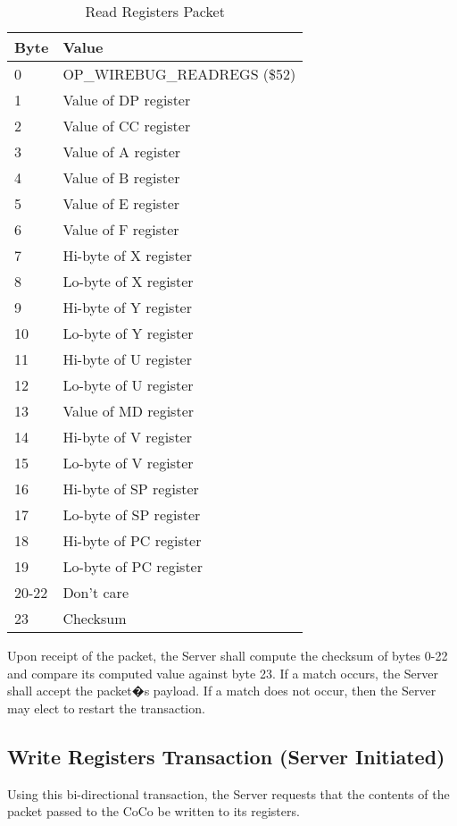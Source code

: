 \documentclass{article}
\begin{document}
\begin{table}[ht]
\caption{Read Registers Packet}
\begin{center}
\begin{tabular}{|ll|}
\hline
Byte & Value \\ \hline
0 & OP\_WIREBUG\_READREGS (\$52) \\
1 & Value of DP register \\
2 & Value of CC register \\
3 & Value of A register \\
4 & Value of B register \\
5 & Value of E register \\
6 & Value of F register \\
7 & Hi-byte of X register \\
8 & Lo-byte of X register \\
9 & Hi-byte of Y register \\
10 & Lo-byte of Y register \\
11 & Hi-byte of U register \\
12 & Lo-byte of U register \\
13 & Value of MD register \\
14 & Hi-byte of V register \\
15 & Lo-byte of V register \\
16 & Hi-byte of SP register \\
17 & Lo-byte of SP register \\
18 & Hi-byte of PC register \\
19 & Lo-byte of PC register \\
20-22 & Don't care \\
23 & Checksum \\
\hline
\end{tabular}
\end{center}
\end{table}

Upon receipt of the packet, the Server shall compute the checksum of bytes 0-22 and compare its computed value against byte 23. If a match occurs, the Server shall accept the packet�s payload.	If a match does not occur, then the Server may elect to restart the transaction.

\subsection{Write Registers Transaction (Server Initiated)}
Using this bi-directional transaction, the Server requests that the contents of the packet passed to the CoCo be written to its registers.
\end{document}
